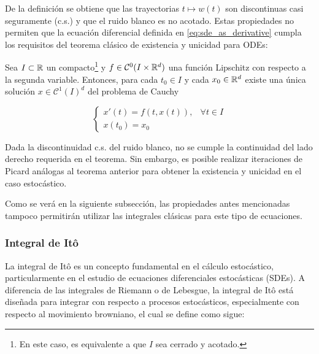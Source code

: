 De la definición se obtiene que las trayectorias $t\mapsto w(t)$ son discontinuas casi seguramente (c.s.) y que el ruido blanco es no acotado. Estas propiedades no permiten que la ecuación diferencial definida en \eqref{eq:sde_as_derivative} cumpla los requisitos del teorema clásico de existencia y unicidad para ODEs:

\begin{teo}
    Sea $I\subset\mathbb{R}$ un compacto\footnote{En este caso, es equivalente a que $I$ sea cerrado y acotado.} y $f\in\mathcal{C}^0(I\times\mathbb{R}^d)$ una función Lipschitz con respecto a la segunda variable. Entonces, para cada $t_0\in I$ y cada $x_0\in\mathbb{R}^d$ existe una única solución $x\in\mathcal{C}^1(I)^d$ del problema de Cauchy

    \begin{equation}
        \begin{cases}
            x'(t) = f(t,x(t)), & \forall t\in I \\
            x(t_0) = x_0
        \end{cases}
    \end{equation}

\end{teo}

Dada la discontinuidad c.s. del ruido blanco, no se cumple la continuidad del lado derecho requerida en el teorema. Sin embargo, es posible realizar iteraciones de Picard análogas al teorema anterior para obtener la existencia y unicidad en el caso estocástico.

Como se verá en la siguiente subsección, las propiedades antes mencionadas tampoco permitirán utilizar las integrales clásicas para este tipo de ecuaciones.

\subsubsection{Integral de Itô}
La integral de Itô es un concepto fundamental en el cálculo estocástico, particularmente en el estudio de ecuaciones diferenciales estocásticas (SDEs). A diferencia de las integrales de Riemann o de Lebesgue, la integral de Itô está diseñada para integrar con respecto a procesos estocásticos, especialmente con respecto al movimiento browniano, el cual se define como sigue:

